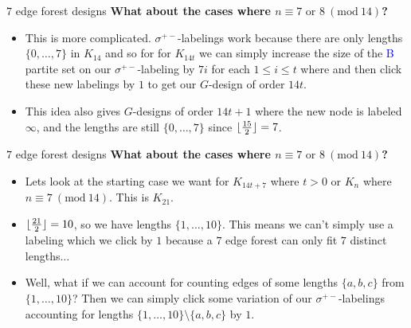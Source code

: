 \documentclass{beamer}
\theoremstyle{plain}
\DeclarePairedDelimiter\floor{\lfloor}{\rfloor} %
\newcommand{\Mod}[1]{\ (\mathrm{mod}\ #1)}
\begin{document}
    \begin{frame}{$7$ edge forest designs}
        \textbf{What about the cases where $n\equiv 7\text{ or }8\Mod{14}$?}
        \pause
        \begin{itemize}
            \item This is more complicated. $\sigma^{+-}$-labelings work because there are only lengths $\{0,\hdots,7\}$ in $K_{14}$ and so for for $K_{14t}$ we can simply increase the size of the \textcolor{blue}{B} partite set on our $\sigma^{+-}$-labeling by $7i$ for each $1\leq i\leq t$ where and then click these new labelings by $1$ to get our $G$-design of order $14t$. 
            \pause
            \item This idea also gives $G$-designs of order $14t+1$ where the new node is labeled $\infty$, and the lengths are still $\{0,\hdots,7\}$ since $\floor{\frac{15}{2}}=7$.

        \end{itemize}

    \end{frame}

    \begin{frame}{$7$ edge forest designs}
        \textbf{What about the cases where $n\equiv 7\text{ or }8\Mod{14}$?}
        \begin{itemize}
            \pause
            
            \item Lets look at the starting case we want for $K_{14t+7}$ where $t>0$ or $K_{n}$ where $n\equiv 7\Mod{14}.$ This is $K_{21}$.
            
            \item $\floor{\frac{21}{2}}=10$, so we have lengths $\{1,\hdots, 10\}$. This means we can't simply use a labeling which we click by $1$ because a $7$ edge forest can only fit $7$ distinct lengths$\hdots$
            
            \item Well, what if we can account for counting edges of some lengths $\{a,b,c\}$ from $\{1,\hdots, 10\}$? Then we can simply click some variation of our $\sigma^{+-}$-labelings accounting for lengths $\{1,\hdots,10\}\setminus \{a,b,c\}$ by $1$. 

        \end{itemize}

    \end{frame}
\end{document}
